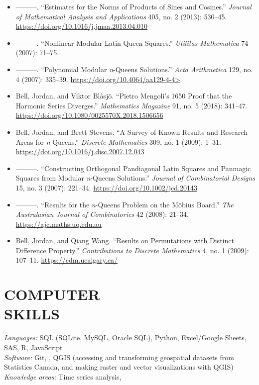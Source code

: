 \documentclass[margin, 10pt]{res} %
\begin{document}
\begin{resume}
\begin{itemize}
\item ———. “Estimates for the Norms of Products of Sines and Cosines.” {\em Journal of Mathematical Analysis and Applications} 405, no. 2 (2013): 530–45. \url{https://doi.org/10.1016/j.jmaa.2013.04.010}

\item ———. “Nonlinear Modular Latin Queen Squares.” {\em Utilitas Mathematica} 74 (2007): 71–75.

\item ———. “Polynomial Modular {\em n}-Queens Solutions.” {\em Acta Arithmetica} 129, no. 4 (2007): 335–39. \url{https://doi.org/10.4064/aa129-4-4>}

\item Bell, Jordan, and Viktor Blåsjö. “Pietro Mengoli’s 1650 Proof that the Harmonic Series Diverges.” {\em Mathematics Magazine} 91, no. 5 (2018): 341–47. \url{https://doi.org/10.1080/0025570X.2018.1506656}

\item Bell, Jordan, and Brett Stevens. “A Survey of Known Results and Research Areas for {\em n}-Queens.” {\em Discrete Mathematics} 309, no. 1 (2009): 1–31. \url{https://doi.org/10.1016/j.disc.2007.12.043}

\item ———. “Constructing Orthogonal Pandiagonal Latin Squares and Panmagic Squares from Modular {\em n}-Queens Solutions.” {\em Journal of Combinatorial Designs} 15, no. 3 (2007): 221–34. \url{https://doi.org/10.1002/jcd.20143}

\item ———. “Results for the {\em n}-Queens Problem on the Möbius Board.” {\em The Australasian Journal of Combinatorics} 42 (2008): 21–34. \url{https://ajc.maths.uq.edu.au}

\item Bell, Jordan, and Qiang Wang. “Results on Permutations with Distinct Difference Property.” {\em Contributions to Discrete Mathematics} 4, no. 1 (2009): 107–11. \url{https://cdm.ucalgary.ca/}
\end{itemize}


\section{COMPUTER \\ SKILLS} 

{\sl Languages:} 
SQL (SQLite, MySQL, Oracle SQL), Python, Excel/Google Sheets, SAS, R, JavaScript \\

{\sl Software:}
Git, , QGIS (accessing and transforming geospatial datasets from Statistics Canada, and making raster and vector visualizations with QGIS)\\

{\sl Knowledge areas:}
Time series analysis, 

\end{resume}
\end{document}
